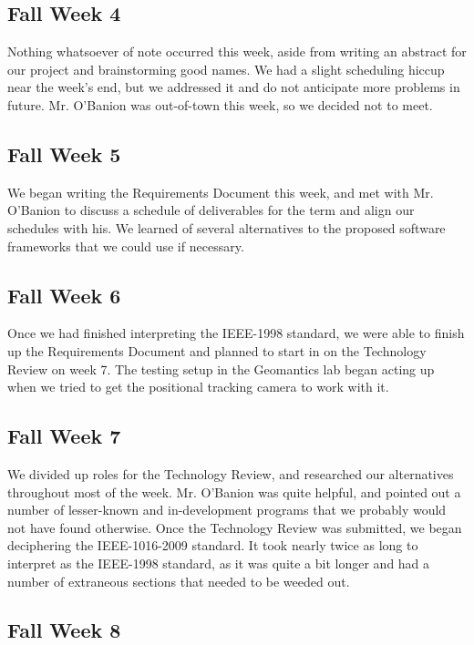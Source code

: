 \documentclass{article}
\begin{document}
\subsection{Fall Week 4}

Nothing whatsoever of note occurred this week, aside from writing an abstract for our project and brainstorming good names. 
We had a slight scheduling hiccup near the week's end, but we addressed it and do not anticipate more problems in future. 
Mr. O'Banion was out-of-town this week, so we decided not to meet.

\subsection{Fall Week 5}

We began writing the Requirements Document this week, and met with Mr. O'Banion to discuss a schedule of deliverables for the term and align our schedules with his. 
We learned of several alternatives to the proposed software frameworks that we could use if necessary.

\subsection{Fall Week 6}

Once we had finished interpreting the IEEE-1998 standard, we were able to finish up the Requirements Document and planned to start in on the Technology Review on week 7. 
The testing setup in the Geomantics lab began acting up when we tried to get the positional tracking camera to work with it.

\subsection{Fall Week 7}

We divided up roles for the Technology Review, and researched our alternatives throughout most of the week. 
Mr. O'Banion was quite helpful, and pointed out a number of lesser-known and in-development programs that we probably would not have found otherwise. 
Once the Technology Review was submitted, we began deciphering the IEEE-1016-2009 standard. 
It took nearly twice as long to interpret as the IEEE-1998 standard, as it was quite a bit longer and had a number of extraneous sections that needed to be weeded out. 

\subsection{Fall Week 8}
\end{document}
